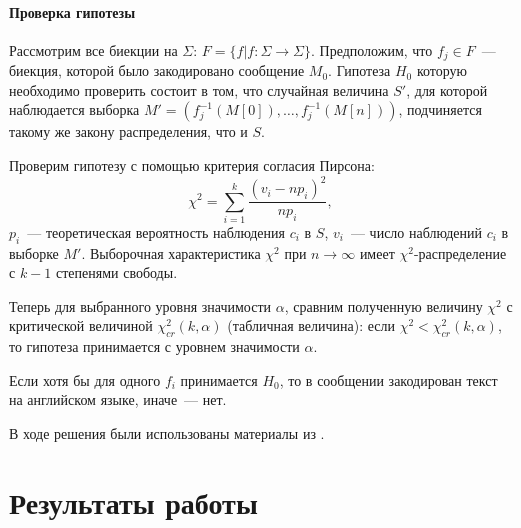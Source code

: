 \documentclass[a4paper,10pt]{article}
\begin{document}
\paragraph{Проверка гипотезы}
Рассмотрим все биекции на $\Sigma$: 
$F = \{ f | f \colon \Sigma \rightarrow \Sigma \}$.
Предположим, что $f_j \in F$~--- биекция, которой было закодировано сообщение 
$M_0$.
Гипотеза $H_0$ которую необходимо проверить состоит в том, 
что случайная величина $S'$, для которой наблюдается выборка 
$M' = (f_j^{-1}(M[0]), \ldots, f_j^{-1}(M[n]))$,
подчиняется такому же закону распределения, что и $S$.

Проверим гипотезу с помощью критерия согласия Пирсона:
$$ \chi^2 = \sum_{i=1}^{k}\frac{(v_i - n p_i)^2}{n p_i}, $$
$p_i$~--- теоретическая вероятность наблюдения $c_i$ в $S$,
$v_i$~--- число наблюдений $c_i$ в выборке $M'$.
Выборочная характеристика $\chi^2$ при $n \rightarrow \infty$ имеет 
$\chi^2$-распределение с $k - 1$ степенями свободы.

Теперь для выбранного уровня значимости $\alpha$, сравним полученную величину
$\chi^2$ с критической величиной $\chi^2_{cr}(k, \alpha)$ (табличная величина): 
если $\chi^2 < \chi^2_{cr}(k, \alpha)$, то гипотеза принимается 
с уровнем значимости $\alpha$.

Если хотя бы для одного $f_i$ принимается $H_0$, то в сообщении закодирован 
текст на английском языке, иначе~--- нет.

В ходе решения были использованы материалы из \cite{ivchenko1984matstat}.

\section{Результаты работы}




\pagebreak



\end{document}
